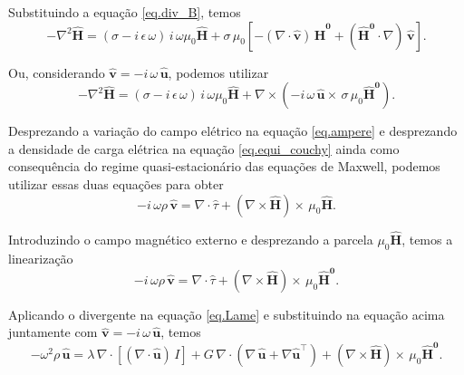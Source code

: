 Substituindo a equa\c{c}\~ao \ref{eq.div_B}, temos
\begin{equation*}
-\nabla^2\mathbf{\widehat{H}}=(\sigma-i\,\epsilon\,\omega)\,i\,\omega\mu_0\mathbf{\widehat{H}}+\sigma\,\mu_0\left[-(\nabla\cdot\mathbf{\widehat{v}})\,\mathbf{\widehat{H}^0}+(\mathbf{\widehat{H}^0}\cdot\nabla)\,\mathbf{\widehat{v}}\right].
\end{equation*}

Ou, considerando $\mathbf{\widehat{v}}=-i\,\omega\,\mathbf{\widehat{u}}$, podemos utilizar
\begin{equation}\label{eq.disp_1}
-\nabla^2\mathbf{\widehat{H}}=(\sigma-i\,\epsilon\,\omega)\,i\,\omega\mu_0\mathbf{\widehat{H}}+\nabla\times(-i\,\omega\,\mathbf{\widehat{u}}\times\,\sigma\,\mu_0\mathbf{\widehat{H}^0}).
\end{equation}

Desprezando a varia\c{c}\~ao do campo el\'etrico na equa\c{c}\~ao \ref{eq.ampere} e desprezando a densidade de carga el\'etrica na equa\c{c}\~ao \ref{eq.equi_couchy} ainda como consequ\^encia do regime quasi-estacion\'ario das equa\c{c}\~oes de Maxwell, podemos utilizar essas duas equa\c{c}\~oes para obter
\begin{equation*}
-i\,\omega\rho\,\mathbf{\widehat{v}}=\nabla\cdot\widehat{\tau}+(\nabla\times\mathbf{\widehat{H}})\times\,\mu_0\mathbf{\widehat{H}}.
\end{equation*}

Introduzindo o campo magn\'etico externo e desprezando a parcela $\mu_0\mathbf{\widehat{H}}$, temos a lineariza\c{c}\~ao
\begin{equation*}
-i\,\omega\rho\,\mathbf{\widehat{v}}=\nabla\cdot\widehat{\tau}+(\nabla\times\mathbf{\widehat{H}})\times\,\mu_0\mathbf{\widehat{H}^0}.
\end{equation*}

Aplicando o divergente na equa\c{c}\~ao \ref{eq.Lame} e substituindo na equa\c{c}\~ao acima juntamente com $\mathbf{\widehat{v}}=-i\,\omega\,\mathbf{\widehat{u}}$, temos
\begin{equation}\label{eq.disp_2}
-\omega^2\rho\,\mathbf{\widehat{u}}=\lambda\,\nabla\cdot[(\nabla\cdot\mathbf{\widehat{u}})\,I] + G\,\nabla\cdot(\nabla\,\mathbf{\widehat{u}}+\nabla\mathbf{\widehat{u}}^\top)+(\nabla\times\mathbf{\widehat{H}})\times\,\mu_0\mathbf{\widehat{H}^0}.
\end{equation}

